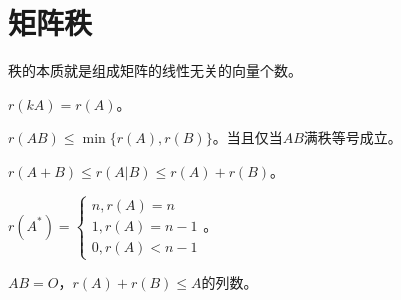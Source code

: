 \documentclass[UTF8, 12pt]{ctexart}
\begin{document}
\section{矩阵秩}

秩的本质就是组成矩阵的线性无关的向量个数。

$r(kA)=r(A)$。

$r(AB)\leqslant\min\{r(A),r(B)\}$。当且仅当$AB$满秩等号成立。

$r(A+B)\leqslant r(A|B)\leqslant r(A)+r(B)$。

$r(A^*)=\left\{\begin{array}{l}
    n, r(A)=n \\
    1, r(A)=n-1 \\
    0, r(A)<n-1
\end{array}\right.$。

$AB=O$，$r(A)+r(B)\leqslant A$的列数。


\end{document}
